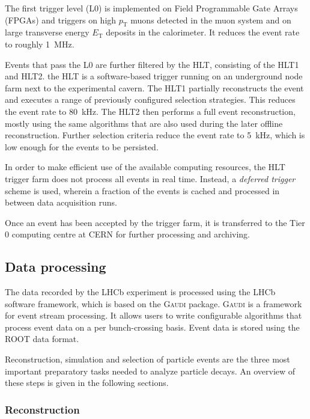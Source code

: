 The first trigger level (L0) is implemented on Field Programmable Gate Arrays (FPGAs) and triggers on high $p_\text{T}$ muons detected in the muon system and on large transverse energy $E_\text{T}$ deposits in the calorimeter.
It reduces the event rate to roughly \SI{1}{MHz}.

Events that pass the L0 are further filtered by the \gls{HLT}, consisting of the HLT1 and HLT2.
the \gls{HLT} is a software-based trigger running on an underground node farm next to the experimental cavern.
The HLT1 partially reconstructs the event and executes a range of previously configured selection strategies.
This reduces the event rate to \SI{80}{kHz}.
The HLT2 then performs a full event reconstruction, mostly using the same algorithms that are also used during the later offline reconstruction.
Further selection criteria reduce the event rate to \SI{5}{kHz}, which is low enough for the events to be persisted.  \cite{Trigger2011} \cite{Trigger2012}

In order to make efficient use of the available computing resources, the HLT trigger farm does not process all events in real time.
Instead, a \emph{deferred trigger} scheme is used, wherein a fraction of the events is cached and processed in between data acquisition runs.

Once an event has been accepted by the trigger farm, it is transferred to the Tier 0 computing centre at \gls{CERN} for further processing and archiving.

\subsection{Data processing}

The data recorded by the LHCb experiment is processed using the LHCb software framework, which is based on the \textsc{Gaudi} package.
\textsc{Gaudi} is a framework for event stream processing.
It allows users to write configurable algorithms that process event data on a per bunch-crossing basis.
Event data is stored using the \textsc{ROOT} \cite{ROOT} data format.

Reconstruction, simulation and selection of particle events are the three most important preparatory tasks needed to analyze particle decays.
An overview of these steps is given in the following sections.

\subsubsection{Reconstruction}

